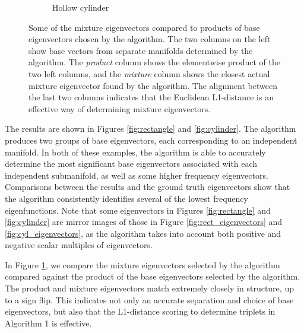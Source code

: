 \documentclass{article}
\numberwithin{equation}{section}
\theoremstyle{definition}
\begin{document}
\begin{figure}
\begin{subfigure}[t]{\textwidth}
        \caption{Hollow cylinder}
    \end{subfigure}
    \caption{Some of the mixture eigenvectors compared to products of base eigenvectors chosen by the algorithm. The two columns on the left show base vectors from separate manifolds determined by the algorithm. The \textit{product} column shows the elementwise product of the two left columns, and the \textit{mixture} column shows the closest actual mixture eigenvector found by the algorithm. The alignment between the last two columns indicates that the Euclidean L1-distance is an effective way of determining mixture eigenvectors.}
    \label{fig:combos}
\end{figure}

The results are shown in Figures \ref{fig:rectangle} and \ref{fig:cylinder}. The algorithm produces two groups of base eigenvectors, each corresponding to an independent manifold. In both of these examples, the algorithm is able to accurately determine the most significant base eigenvectors associated with each independent submanifold, as well as some higher frequency eigenvectors. Comparisons between the results and the ground truth eigenvectors show that the algorithm consistently identifies several of the lowest frequency eigenfunctions. Note that some eigenvectors in Figures \ref{fig:rectangle} and \ref{fig:cylinder} are mirror images of those in Figure \ref{fig:rect_eigenvectors} and \ref{fig:cyl_eigenvectors}, as the algorithm takes into account both positive and negative scalar multiples of eigenvectors.

In Figure \ref{fig:combos}, we compare the mixture eigenvectors selected by the algorithm compared against the product of the base eigenvectors selected by the algorithm. The product and mixture eigenvectors match extremely closely in structure, up to a sign flip. This indicates not only an accurate separation and choice of base eigenvectors, but also that the L1-distance scoring to determine triplets in Algorithm 1 is effective.
\end{document}

